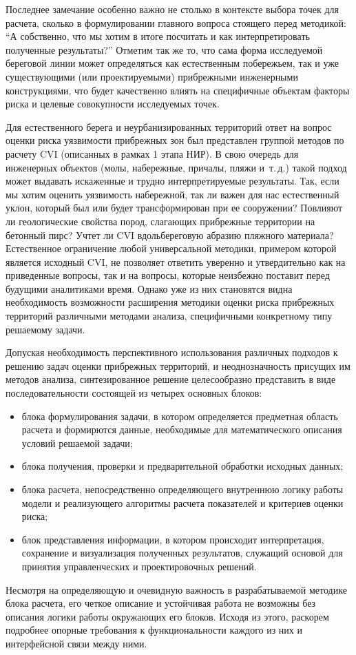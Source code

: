 Последнее замечание особенно важно не столько в контексте выбора точек для расчета, сколько в формулировании главного вопроса стоящего перед методикой: \enquote{А собственно, что мы хотим в итоге посчитать и как интерпретировать полученные результаты?}
Отметим так же то, что сама форма исследуемой береговой линии может определяться как естественным побережьем, так и уже существующими (или проектируемыми) прибрежными инженерными конструкциями, что будет качественно влиять на специфичные объектам факторы риска и целевые совокупности исследуемых точек.

Для естественного берега и неурбанизированных территорий ответ на вопрос оценки риска уязвимости прибрежных зон был представлен группой методов по расчету CVI (описанных в рамках 1 этапа НИР).
В свою очередь для инженерных объектов (молы, набережные, причалы, пляжи и~т.\,д.) такой подход может выдавать искаженные и трудно интерпретируемые результаты.
Так, если мы хотим оценить уязвимость набережной, так ли важен для нас естественный уклон, который был или будет трансформирован при ее сооружении? 
Повлияют ли геологические свойства пород, слагающих прибрежные территории на бетонный пирс? 
Учтет ли CVI вдольбереговую абразию пляжного материала?
Естественное ограничение любой универсальной методики, примером которой является исходный CVI, не позволяет ответить уверенно и утвердительно как на приведенные вопросы, так и на вопросы, которые неизбежно поставит перед будущими аналитиками время.
Однако уже из них становятся видна необходимость возможности расширения методики оценки риска прибрежных территорий различными методами анализа, специфичными конкретному типу решаемому задачи.

Допуская необходимость перспективного использования различных подходов к решению задач оценки прибрежных территорий, и неоднозначность присущих им методов анализа, синтезированное решение целесообразно представить в виде последовательности состоящей из четырех основных блоков:
\begin{itemize}
\item блока формулирования задачи, в котором определяется предметная область расчета и формирются данные, необходимые для математического описания условий решаемой задачи;
\item блока получения, проверки и предварительной обработки исходных данных;
\item блока расчета, непосредственно определяющего внутреннюю логику работы модели и реализующего алгоритмы расчета показателей и критериев оценки риска;
\item блок представления информации, в котором происходит интерпретация, сохранение и визуализация полученных результатов, служащий основой для принятия управленческих и проектировочных решений.
\end{itemize}

Несмотря на определяющую и очевидную важность в разрабатываемой методике блока расчета, его четкое описание и устойчивая работа не возможны без описания логики работы окружающих его блоков.
Исходя из этого, раскорем подробнее опорные требования к функциональности каждого из них и интерфейсной связи между ними.
